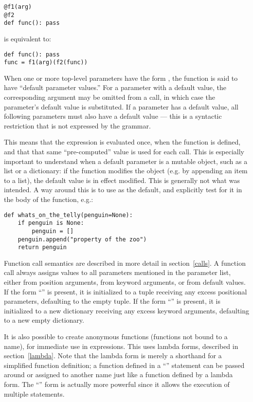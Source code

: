 \begin{verbatim}
@f1(arg)
@f2
def func(): pass
\end{verbatim}

is equivalent to:

\begin{verbatim}
def func(): pass
func = f1(arg)(f2(func))
\end{verbatim}

When one or more top-level parameters have the form 
\code{=} , the function is said to have ``default
parameter values.''  For a parameter with a
default value, the corresponding argument may be omitted from a call,
in which case the parameter's default value is substituted.  If a
parameter has a default value, all following parameters must also have
a default value --- this is a syntactic restriction that is not
expressed by the grammar.

  This means that the expression is evaluated
once, when the function is defined, and that that same
``pre-computed'' value is used for each call.  This is especially
important to understand when a default parameter is a mutable object,
such as a list or a dictionary: if the function modifies the object
(e.g. by appending an item to a list), the default value is in effect
modified.  This is generally not what was intended.  A way around this 
is to use  as the default, and explicitly test for it in
the body of the function, e.g.:

\begin{verbatim}
def whats_on_the_telly(penguin=None):
    if penguin is None:
        penguin = []
    penguin.append("property of the zoo")
    return penguin
\end{verbatim}

Function call semantics are described in more detail in
section~\ref{calls}.
A function call always assigns values to all parameters mentioned in
the parameter list, either from position arguments, from keyword
arguments, or from default values.  If the form ``''
is present, it is initialized to a tuple receiving any excess
positional parameters, defaulting to the empty tuple.  If the form
``'' is present, it is initialized to a new
dictionary receiving any excess keyword arguments, defaulting to a
new empty dictionary.

It is also possible to create anonymous functions (functions not bound
to a name), for immediate use in expressions.  This uses lambda forms,
described in section~\ref{lambda}.  Note that the lambda form is
merely a shorthand for a simplified function definition; a function
defined in a ``'' statement can be passed around or
assigned to another name just like a function defined by a lambda
form.  The ``'' form is actually more powerful since it
allows the execution of multiple statements.

